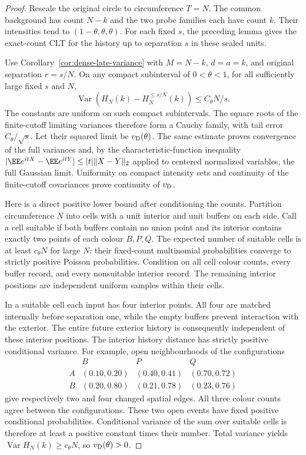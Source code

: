 \documentclass[11pt,letterpaper]{article}
\begin{document}
\begin{proof}
Rescale the original circle to circumference $T=N$.
The common background has count $N-k$ and the two probe
families each have count $k$. Their intensities tend to
$(1-\theta,\theta,\theta)$.
For each fixed $s$, the preceding lemma gives the exact-count
CLT for the history up to separation $s$ in these scaled units.

Use Corollary~\ref{cor:dense-late-variance} with
$M=N-k$, $d=a=k$, and original separation $r=s/N$.
On any compact subinterval of $0<\theta<1$, for all sufficiently
large fixed $s$ and $N$,
\[
 \operatorname{Var}(H_N(k)-H_N^{\le s/N}(k))
                       \le C_\theta N/s.
\]
The constants are uniform on such compact subintervals.
The square roots of the finite-cutoff limiting variances
therefore form a Cauchy family, with tail error $C_\theta/\sqrt s$.
Let their squared limit be $v_{\rm D}(\theta)$.
The same estimate proves convergence of the full variances
and, by the characteristic-function inequality
$|\EE e^{itX}-\EE e^{itY}|\le |t|\|X-Y\|_2$ applied to
centered normalized variables, the full Gaussian limit.
Uniformity on compact intensity sets and continuity of the
finite-cutoff covariances prove continuity of $v_{\rm D}$.

Here is a direct positive lower bound after conditioning the
counts. Partition circumference $N$ into cells with a unit
interior and unit buffers on each side. Call a cell suitable
if both buffers contain no union point and its interior
contains exactly two points of each colour $B,P,Q$.
The expected number of suitable cells is at least
$c_\theta N$ for large $N$: their fixed-count multinomial
probabilities converge to strictly positive Poisson probabilities.
Condition on all cell colour counts, every buffer record,
and every nonsuitable interior record. The remaining interior
positions are independent uniform samples within their cells.

In a suitable cell each input has four interior points. All
four are matched internally before separation one, while
the empty buffers prevent interaction with the exterior.
The entire future exterior history is consequently independent
of these interior positions. The interior history distance
has strictly positive conditional variance. For example,
open neighbourhoods of the configurations
\[
 \begin{array}{c|ccc}
     &B&P&Q\\ \hline
  A&(0.10,0.20)&(0.40,0.41)&(0.70,0.72)\\
  B&(0.20,0.80)&(0.21,0.78)&(0.23,0.76)
 \end{array}
\]
give respectively two and four changed spatial edges.
All three colour counts agree between the configurations.
These two open events have fixed positive conditional probabilities.
Conditional variance of the sum over suitable cells is
therefore at least a positive constant times their number.
Total variance yields $\operatorname{Var}H_N(k)\ge c_\theta N$,
so $v_{\rm D}(\theta)>0$.


\end{proof}
\end{document}
